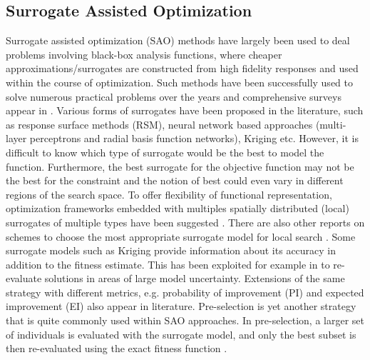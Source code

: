 \subsection{Surrogate Assisted Optimization}
Surrogate assisted optimization (SAO) methods have largely been used to deal problems involving black-box analysis functions, where cheaper approximations/surrogates are constructed from high fidelity responses and used within the course of optimization. Such methods have been successfully used to solve numerous practical problems
over the years \cite{santana2010, kazemi2011, lim2010surrogate} and comprehensive surveys appear in \cite{jin2005uncertain,jin2005approx,jin2011surrogate,shi2010expensive}.  Various forms of surrogates
have been proposed in the literature, such as response surface methods (RSM), neural network based approaches (multi-layer perceptrons and radial basis function networks), Kriging etc. However, it is difficult to know which type of surrogate would be the best to model the function. Furthermore, the best surrogate for the objective function may not be the best for the constraint and the notion of best could even vary in different regions of the search space. To offer flexibility of functional representation, optimization frameworks embedded with multiples spatially distributed (local) surrogates of multiple types have been suggested \cite{isaacs2009,liu2014gaussian}. There are also other reports on schemes to choose the most appropriate surrogate model for local search \cite{le2013adsurro}. Some surrogate models such as Kriging provide information about its accuracy in addition to the fitness estimate. This has been exploited for example in \cite{branke2005fast} to re-evaluate solutions in areas of large model uncertainty. Extensions of the same strategy with different metrics, e.g. probability of improvement (PI) and expected improvement (EI) also appear in literature. Pre-selection is yet another strategy that is quite commonly used within SAO approaches. In pre-selection, a larger set of individuals is evaluated with the surrogate model, and only the best subset is then re-evaluated using the exact fitness function \cite{emmerich2002meta, loshchilov2010}.

